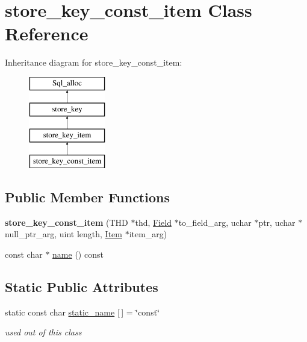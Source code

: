 \hypertarget{classstore__key__const__item}{}\section{store\+\_\+key\+\_\+const\+\_\+item Class Reference}
\label{classstore__key__const__item}
Inheritance diagram for store\+\_\+key\+\_\+const\+\_\+item\+:\begin{figure}[H]
\begin{center}
\leavevmode
\includegraphics[height=4.000000cm]{classstore__key__const__item}
\end{center}
\end{figure}
\subsection*{Public Member Functions}
\begin{DoxyCompactItemize}
\item 
\mbox{\label{classstore__key__const__item_ae02f7b8115a867e2960282daeaec6fb9}} 
{\bfseries store\+\_\+key\+\_\+const\+\_\+item} (T\+HD $\ast$thd, \mbox{\hyperlink{classField}{Field}} $\ast$to\+\_\+field\+\_\+arg, uchar $\ast$ptr, uchar $\ast$null\+\_\+ptr\+\_\+arg, uint length, \mbox{\hyperlink{classItem}{Item}} $\ast$item\+\_\+arg)
\item 
const char $\ast$ \mbox{\hyperlink{classstore__key__const__item_a1c578851203067d4ab3c90b81d7b3cfa}{name}} () const
\end{DoxyCompactItemize}
\subsection*{Static Public Attributes}
\begin{DoxyCompactItemize}
\item 
static const char \mbox{\hyperlink{group__Query__Optimizer_ga3c214b7ed8212280406d828d8354632d}{static\+\_\+name}} \mbox{[}$\,$\mbox{]} = \char`\"{}const\char`\"{}
\begin{DoxyCompactList}\small\item\em used out of this class \end{DoxyCompactList}\end{DoxyCompactItemize}

